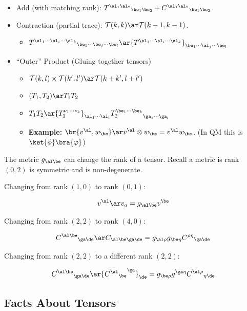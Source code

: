 \documentclass{article}
\begin{document}
\begin{itemize}
    \item Add (with matching rank): ${T^{\al_1\al_2}}_{\be_1\be_2} + {C^{\al_1\al_2}}_{\be_1\be_2}$.
    \item Contraction (partial trace): $\mathcal{T} (k, k) \ar \mathcal{T} (k-1, k-1)$.
    \begin{itemize}
        \item ${T^{\al_1\cdots\al_i\cdots\al_k}}_{\be_1\cdots\be_j\cdots\be_l} \ar {T^{\al_1\cdots\al_i\cdots\al_k}}_{\be_1\cdots\al_j\cdots\be_l}$
    \end{itemize}
    \item ``Outer'' Product (Gluing together tensors)
    \begin{itemize}
        \item $\mathcal{T}(k,l) \times \mathcal{T}(k',l') \ar \mathcal{T}(k + k', l+ l')$
        \item $(T_1, T_2) \ar T_1T_2$
        \item $T_1 T_2 \ar {T_1^{\nu_1\cdots\nu_k}}_{\al_1\cdots\al_l} {T_2^{\be_1\cdots\be_k}}_{\ga_1\cdots\ga_l}$
        \item \textbf{Example:} $\br{v^\al, w_\be} \ar v^\al \otimes w_\be = v^\al w_\be$. (In QM this is $\ket{\phi}\bra{\varphi}$)
    \end{itemize}
\end{itemize}

The metric $g_{\al\be}$ can change the rank of a tensor. Recall a metric is rank $(0,2)$ is symmetric and is non-degenerate.


Changing from rank $(1,0)$ to rank $(0,1)$:

\[ v^\al \ar v_a = g_{\al\be} v^\be \]

Changing from rank $(2,2)$ to rank $(4,0)$:

\[ {C^{\al\be}}_{\ga\de} \ar C_{\al\be\ga\de} = g_{\al\rho}g_{\be\eta} {C^{\rho\eta}}_{\ga\de} \]

Changing from rank $(2,2)$ to a different rank $(2,2)$:

\[ {C^{\al\be}}_{\ga\de} \ar {{{C^{\al}}_\be}^{\ga}}_\de = g_{\be\rho}g^{\ga\eta} {C^{\al\rho}}_{\eta\de} \]

\subsection{Facts About Tensors}

\end{document}
